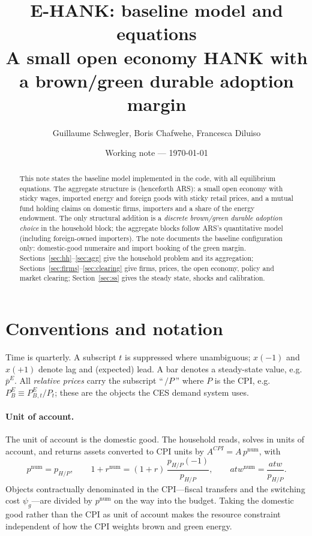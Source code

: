 \documentclass[11pt]{article}
\title{\textbf{E-HANK: baseline model and equations}\\[2pt]
\large A small open economy HANK with a brown/green durable adoption margin}
\author{Guillaume Schwegler, Boris Chafwehe, Francesca Diluiso}
\date{Working note --- \today}
\newcommand{\num}{\mathrm{num}}
\newcommand{\PEB}{P^{E}_{B}}
\newcommand{\pE}{p^{E}}
\begin{document}
\maketitle

\begin{abstract}
\noindent This note states the baseline model implemented in the code, with all
equilibrium equations. The aggregate structure is \cite{ARS2024} (henceforth
ARS): a small open economy with sticky wages, imported energy and foreign goods
with sticky retail prices, and a mutual fund holding claims on domestic firms,
importers and a share of the energy endowment. The only structural addition is
a \emph{discrete brown/green durable adoption choice} in the household block;
the aggregate blocks follow ARS's quantitative model (including foreign-owned
importers). The note documents the baseline
configuration only: domestic-good numeraire and import booking of the green
margin. Sections~\ref{sec:hh}--\ref{sec:agg} give the household problem and its
aggregation; Sections~\ref{sec:firms}--\ref{sec:clearing} give firms, prices,
the open economy, policy and market clearing; Section~\ref{sec:ss} gives the
steady state, shocks and calibration.
\end{abstract}

\section{Conventions and notation}

Time is quarterly. A subscript $t$ is suppressed where unambiguous; $x(-1)$ and
$x(+1)$ denote lag and (expected) lead. A bar denotes a steady-state value,
e.g.\ $\bar\pE$. All \emph{relative prices} carry the subscript ``\,$/P$\,''
where $P$ is the CPI, e.g.\ $\PEB\equiv \PEB{}_{,t}/P_t$; these are the objects
the CES demand system uses.

\paragraph{Unit of account.} The unit of account is the domestic good. The
household reads, solves in units of account, and returns assets converted to CPI
units by $A^{CPI}=A\,p^{\num}$, with
\begin{equation}
p^{\num}=p_{H/P},\qquad
1+r^{\num}=(1+r)\,\frac{p_{H/P}(-1)}{p_{H/P}},\qquad
atw^{\num}=\frac{atw}{p_{H/P}} .
\end{equation}
Objects contractually denominated in the CPI---fiscal transfers and the
switching cost $\psi_g$---are divided by $p^{\num}$ on the way into the budget.
Taking the domestic good rather than the CPI as unit of account makes the
resource constraint independent of how the CPI weights brown and green energy.
\end{document}
